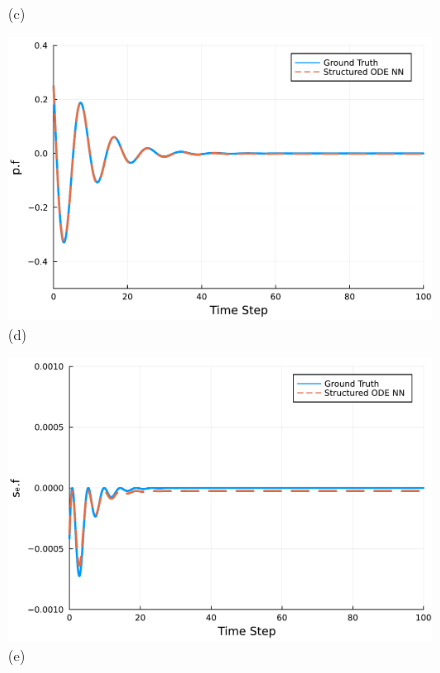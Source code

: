 \documentclass[
	parskip, 			   %
	twoside, 			   %
	DIV=14, 			   %
	BCOR=15.0mm, 		   %
	headsepline, 		   %
	open=right, 		   %
	captions=tableheading, %
	bibliography=totoc,    %
	numbers=noenddot       %
]{scrreprt}
\begin{document}
\begin{figure}[h!]
\begin{minipage}{.3\textwidth}
    \\(c)
    \end{minipage}
    \begin{minipage}{.3\textwidth}
    \centering
    \includegraphics[width=1\linewidth]{figures/p.f_compositional_idho.pdf}
    \\(d)
    \end{minipage}%
    \begin{minipage}{.3\textwidth}
    \centering
    \includegraphics[width=1\linewidth]{figures/se.f_compositional_idho.pdf}
    \\(e)
    \end{minipage}%
    \begin{minipage}{.3\textwidth}
    \centering

\end{minipage}
\end{figure}
\end{document}

